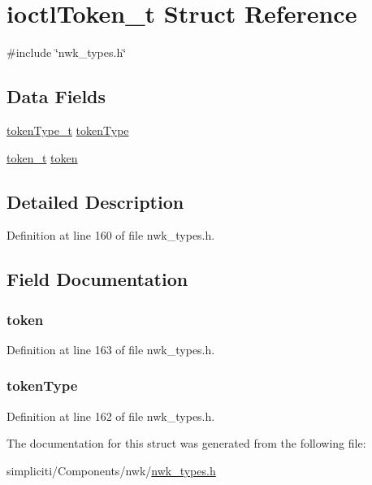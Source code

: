 \hypertarget{structioctlToken__t}{\section{ioctl\-Token\-\_\-t \-Struct \-Reference}
\label{structioctlToken__t}
}


{\ttfamily \#include \char`\"{}nwk\-\_\-types.\-h\char`\"{}}

\subsection*{\-Data \-Fields}
\begin{DoxyCompactItemize}
\item 
\hyperlink{nwk__types_8h_a3369a43c2500da7fabaa8d4b8effb706}{token\-Type\-\_\-t} \hyperlink{structioctlToken__t_a79dabe0f00ed3a1ff15901ad3723f16a}{token\-Type}
\item 
\hyperlink{uniontoken__t}{token\-\_\-t} \hyperlink{structioctlToken__t_a6730f3039f1596a8af51447e361caae5}{token}
\end{DoxyCompactItemize}


\subsection{\-Detailed \-Description}


\-Definition at line 160 of file nwk\-\_\-types.\-h.



\subsection{\-Field \-Documentation}
\hypertarget{structioctlToken__t_a6730f3039f1596a8af51447e361caae5}{
\subsubsection[{token}]{ {\bf token}}}\label{structioctlToken__t_a6730f3039f1596a8af51447e361caae5}


\-Definition at line 163 of file nwk\-\_\-types.\-h.

\hypertarget{structioctlToken__t_a79dabe0f00ed3a1ff15901ad3723f16a}{
\subsubsection[{token\-Type}]{ {\bf token\-Type}}}\label{structioctlToken__t_a79dabe0f00ed3a1ff15901ad3723f16a}


\-Definition at line 162 of file nwk\-\_\-types.\-h.



\-The documentation for this struct was generated from the following file\-:\begin{DoxyCompactItemize}
\item 
simpliciti/\-Components/nwk/\hyperlink{nwk__types_8h}{nwk\-\_\-types.\-h}\end{DoxyCompactItemize}
